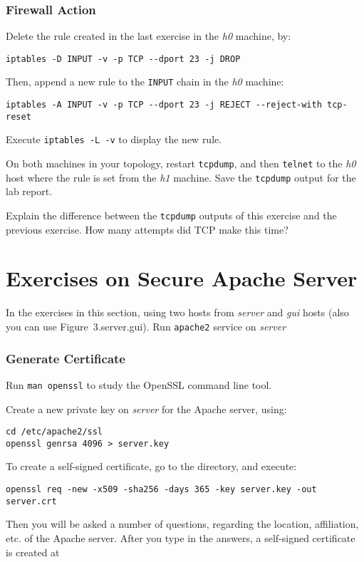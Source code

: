 \documentclass{../UTNetLab}
\begin{document}
\section{Firewall Action}
    Delete the rule created in the last exercise in the \textit{h0} machine, by:    
    \begin{lstlisting}[morekeywords={[3]INPUT,TCP,DROP}]
iptables -D INPUT -v -p TCP --dport 23 -j DROP
    \end{lstlisting}
    
    Then, append a new rule to the \texttt{INPUT} chain in the \textit{h0} machine:    
    \begin{lstlisting}[morekeywords={[3]INPUT,TCP,REJECT,tcp-reset}]
iptables -A INPUT -v -p TCP --dport 23 -j REJECT --reject-with tcp-reset
    \end{lstlisting}
    
    Execute \lstinline{iptables -L -v} to display the new rule.

    On both machines in your topology, restart \lstinline{tcpdump}, and then \lstinline{telnet} to the \textit{h0} host where the rule is set from the \textit{h1} machine.
    Save the \lstinline{tcpdump} output for the lab report.
    
    \begin{report}
        \item Explain the difference between the \lstinline{tcpdump} outputs of this exercise and the previous exercise.
            How many attempts did {TCP} make this time?
    \end{report}

\part{Exercises on Secure Apache Server}
    In the exercises in this section, using two hosts from \textit{server} and \textit{gui} hosts (also you can use {Figure~3.server.gui}).
    Run \lstinline{apache2} service on \textit{server}

\section{Generate Certificate}
    Run \lstinline{man openssl} to study the OpenSSL command line tool.

    Create a new private key on \textit{server} for the Apache server, using:
    \begin{lstlisting}[emph={server,key},morekeywords={[2]genrsa}]
cd /etc/apache2/ssl
openssl genrsa 4096 > server.key
    \end{lstlisting}
    To create a self-signed certificate, go to the  directory, and execute:
    \begin{lstlisting}[emph={server,key,crt},morekeywords={[2]req}]
openssl req -new -x509 -sha256 -days 365 -key server.key -out server.crt
    \end{lstlisting}
    Then you will be asked a number of questions, regarding the location, affiliation, etc.
    of the Apache server.
    After you type in the answers, a self-signed certificate is created at 
\end{document}
